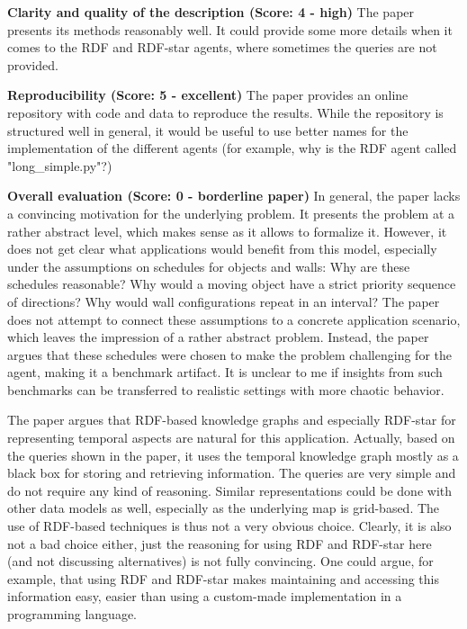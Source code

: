 \documentclass[runningheads]{llncs}
\begin{document}
\textbf{Clarity and quality of the description (Score: 4 - high)} \quad The paper presents its methods reasonably well. It could provide some more details when it comes to the RDF and RDF-star agents, where sometimes the queries are not provided.

\textbf{Reproducibility (Score: 5 - excellent)} \quad The paper provides an online repository with code and data to reproduce the results. While the repository is structured well in general, it would be useful to use better names for the implementation of the different agents (for example, why is the RDF agent called "long\_simple.py"?)

\textbf{Overall evaluation (Score: 0 - borderline paper)} \quad In general, the paper lacks a convincing motivation for the underlying problem. It presents the problem at a rather abstract level, which makes sense as it allows to formalize it. However, it does not get clear what applications would benefit from this model, especially under the assumptions on schedules for objects and walls: Why are these schedules reasonable? Why would a moving object have a strict priority sequence of directions? Why would wall configurations repeat in an interval? The paper does not attempt to connect these assumptions to a concrete application scenario, which leaves the impression of a rather abstract problem. Instead, the paper argues that these schedules were chosen to make the problem challenging for the agent, making it a benchmark artifact. It is unclear to me if insights from such benchmarks can be transferred to realistic settings with more chaotic behavior.

The paper argues that RDF-based knowledge graphs and especially RDF-star for representing temporal aspects are natural for this application. Actually, based on the queries shown in the paper, it uses the temporal knowledge graph mostly as a black box for storing and retrieving information. The queries are very simple and do not require any kind of reasoning. Similar representations could be done with other data models as well, especially as the underlying map is grid-based. The use of RDF-based techniques is thus not a very obvious choice. Clearly, it is also not a bad choice either, just the reasoning for using RDF and RDF-star here (and not discussing alternatives) is not fully convincing. One could argue, for example, that using RDF and RDF-star makes maintaining and accessing this information easy, easier than using a custom-made implementation in a programming language.
\end{document}
